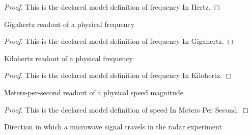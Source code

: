 \begin{proof}
  This is the declared model definition of frequency In Hertz.
\end{proof}
\begin{definition}
  \label{def:physics:phyx-mini-0525:phyxminiproblems-problemphyxmini0525-frequencyingigahertz}
  Gigahertz readout of a physical frequency
\end{definition}
\begin{proof}
  This is the declared model definition of frequency In Gigahertz.
\end{proof}
\begin{definition}
  \label{def:physics:phyx-mini-0525:phyxminiproblems-problemphyxmini0525-frequencyinkilohertz}
  Kilohertz readout of a physical frequency
\end{definition}
\begin{proof}
  This is the declared model definition of frequency In Kilohertz.
\end{proof}
\begin{definition}
  \label{def:physics:phyx-mini-0525:phyxminiproblems-problemphyxmini0525-speedinmeterspersecond}
  Meters-per-second readout of a physical speed magnitude
\end{definition}
\begin{proof}
  This is the declared model definition of speed In Meters Per Second.
\end{proof}
\begin{definition}
  \label{def:physics:phyx-mini-0525:phyxminiproblems-problemphyxmini0525-microwavetraveldirection}
  Direction in which a microwave signal travels in the radar experiment
\end{definition}
